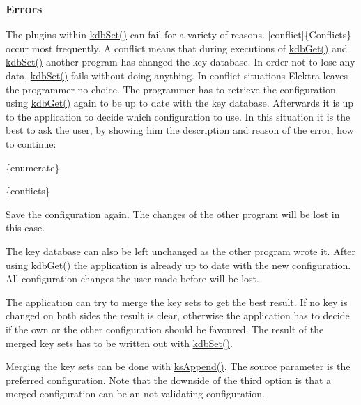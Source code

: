 \subsubsection*{Errors}

The plugins within {\ttfamily \hyperlink{group__kdb_ga11436b058408f83d303ca5e996832bcf}{kdb\+Set()}} can fail for a variety of reasons. \mbox{[}conflict\mbox{]}\{Conflicts\} occur most frequently. A conflict means that during executions of {\ttfamily \hyperlink{group__kdb_ga28e385fd9cb7ccfe0b2f1ed2f62453a1}{kdb\+Get()}} and {\ttfamily \hyperlink{group__kdb_ga11436b058408f83d303ca5e996832bcf}{kdb\+Set()}} another program has changed the key database. In order not to lose any data, {\ttfamily \hyperlink{group__kdb_ga11436b058408f83d303ca5e996832bcf}{kdb\+Set()}} fails without doing anything. In conflict situations Elektra leaves the programmer no choice. The programmer has to retrieve the configuration using {\ttfamily \hyperlink{group__kdb_ga28e385fd9cb7ccfe0b2f1ed2f62453a1}{kdb\+Get()}} again to be up to date with the key database. Afterwards it is up to the application to decide which configuration to use. In this situation it is the best to ask the user, by showing him the description and reason of the error, how to continue\+:

\{enumerate\}

\{conflicts\}

Save the configuration again. The changes of the other program will be lost in this case.

The key database can also be left unchanged as the other program wrote it. After using {\ttfamily \hyperlink{group__kdb_ga28e385fd9cb7ccfe0b2f1ed2f62453a1}{kdb\+Get()}} the application is already up to date with the new configuration. All configuration changes the user made before will be lost.

The application can try to merge the key sets to get the best result. If no key is changed on both sides the result is clear, otherwise the application has to decide if the own or the other configuration should be favoured. The result of the merged key sets has to be written out with {\ttfamily \hyperlink{group__kdb_ga11436b058408f83d303ca5e996832bcf}{kdb\+Set()}}.

Merging the key sets can be done with {\ttfamily \hyperlink{group__keyset_ga21eb9c3a14a604ee3a8bdc779232e7b7}{ks\+Append()}}. The source parameter is the preferred configuration. Note that the downside of the third option is that a merged configuration can be an not validating configuration.

